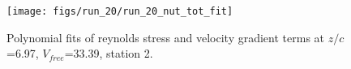 \begin{figure}[H]
\centering
\texttt{[image: figs/run\_20/run\_20\_nut\_tot\_fit]}
\caption{Polynomial fits of reynolds stress and velocity gradient terms at $z/c$=6.97, $V_{free}$=33.39, station 2.}
\label{fig:run_20_nut_tot_fit}
\end{figure}


